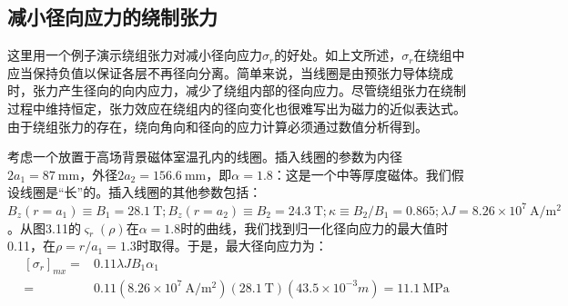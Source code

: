 \subsection{减小径向应力的绕制张力}
这里用一个例子演示绕组张力对减小径向应力$\sigma_{r}$的好处。如上文所述，$\sigma_{r}$在绕组中应当保持负值以保证各层不再径向分离。简单来说，当线圈是由预张力导体绕成时，张力产生径向的向内应力，减少了绕组内部的径向应力。尽管绕组张力在绕制过程中维持恒定，张力效应在绕组内的径向变化也很难写出为磁力的近似表达式。由于绕组张力的存在，绕向角向和径向的应力计算必须通过数值分析得到。

考虑一个放置于高场背景磁体室温孔内的线圈。插入线圈的参数为内径$2a_1=87\ \mathrm{mm}$，外径$2a_2=156.6\ \mathrm{mm}$，即$\alpha = 1.8$：这是一个中等厚度磁体。我们假设线圈是“长”的。插入线圈的其他参数包括：
$B_z(r=a_1)\equiv B_1 =28.1\ \mathrm{T}; B_z(r=a_2)\equiv B_2 =24.3\ \mathrm{T};\kappa\equiv B_2/B_1 = 0.865; \lambda J =8.26×10^7 \ \mathrm{A/m^2}$。从图3.11的$\varsigma_r(\rho)$在$\alpha=1.8$时的曲线，我们找到归一化径向应力的最大值时0.11，在$\rho=r/a_1=1.3$时取得。于是，最大径向应力为：
\begin{equation*}
\begin{split}
  [\sigma_r]_{mx}=&0.11\lambda JB_1\alpha_1 \\
   =&0.11(8.26\times 10^7 \ \mathrm{A/m^2})(28.1\ \mathrm{T})(43.5\times 10^{-3}m)=11.1\ \mathrm{MPa}%
\end{split}
\end{equation*}

